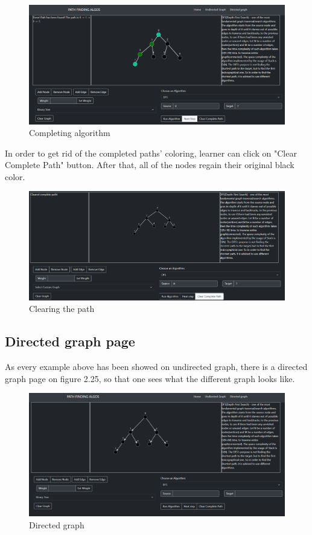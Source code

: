 \begin{figure}[H]
	\centering
	\includegraphics[width=\textwidth]{images/showing_complete_path.png}
	\caption{Completing algorithm}
\end{figure}

In order to get rid of the completed paths' coloring, learner can click on "Clear Complete Path" button. After that, all of the nodes regain their original black color.

\begin{figure}[H]
	\centering
	\includegraphics[width=\textwidth]{images/cleared_complete_path.png}
	\caption{Clearing the path}
\end{figure}

\subsection{Directed graph page}

As every example above has been showed on undirected graph, there is a directed graph page on figure 2.25, so that one sees what the different graph looks like.

\begin{figure}[H]
	\centering
	\includegraphics[width=\textwidth]{images/directed_graph.png}
	\caption{Directed graph}
\end{figure}


